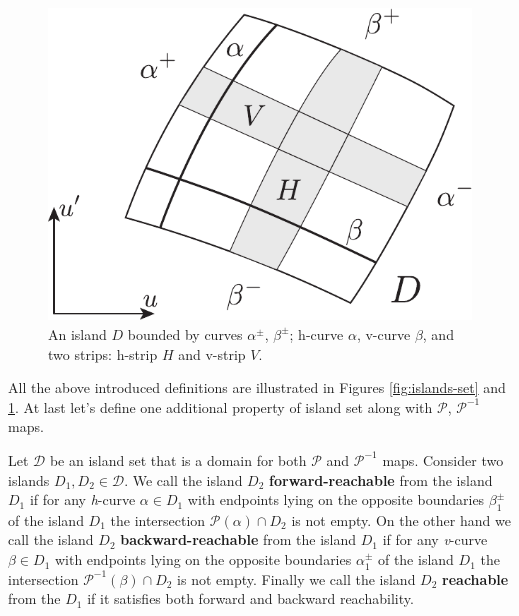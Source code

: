 \begin{figure}[h]
\centering
	\includegraphics[scale = 1]{pic/curves and strips}
	\caption{An island $D$ bounded by curves $\alpha^{\pm}$, $\beta^{\pm}$; h-curve $\alpha$, v-curve $\beta$, and two strips: h-strip $H$ and v-strip $V$.}
\label{fig:curves-and-strips}
\end{figure}

All the above introduced definitions are illustrated in Figures \ref{fig:islands-set} and \ref{fig:curves-and-strips}.
At last let's define one additional property of island set along with $\mathcal{P}$, $\mathcal{P}^{-1}$ maps.

\begin{definition}
	Let $\mathcal{D}$ be an island set that is a domain for both $\mathcal{P}$ and $\mathcal{P}^{-1}$ maps.
	Consider two islands $D_1, D_2 \in \mathcal{D}$.
	We call the island $D_2$ {\bf forward-reachable} from the island $D_1$ if for any \emph{h}-curve $\alpha \in D_1$ with endpoints lying on the opposite boundaries $\beta_1^{\pm}$ of the island $D_1$ the intersection $\mathcal{P}(\alpha) \cap D_2$ is not empty.
	On the other hand we call the island $D_2$ {\bf backward-reachable} from the island $D_1$ if for any \emph{v}-curve $\beta \in D_1$ with endpoints lying on the opposite boundaries $\alpha_1^{\pm}$ of the island $D_1$ the intersection $\mathcal{P}^{-1}(\beta) \cap D_2$ is not empty.
	Finally we call the island $D_2$ {\bf reachable} from the $D_1$ if it satisfies both forward and backward reachability.
\end{definition}

